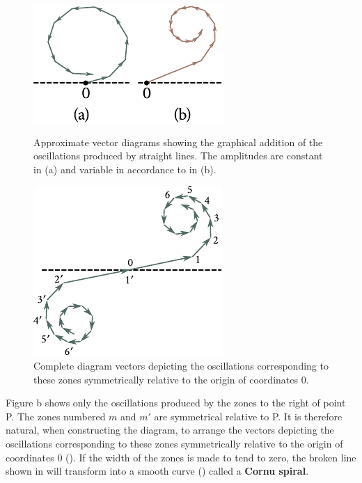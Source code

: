 \begin{figure}[t]
	\begin{minipage}[t]{0.48\linewidth}
		\begin{center}
			\includegraphics[scale=1]{figures/ch_18/fig_18_17.pdf}
            \caption[]{Approximate vector diagrams showing the graphical addition of the oscillations produced by straight lines. The amplitudes are constant in (a) and variable in accordance to  in (b).}
			\label{fig:18_17}
		\end{center}
	\end{minipage}
	\hfill{ }%
	\begin{minipage}[t]{0.48\linewidth}
		\begin{center}
			\includegraphics[scale=1]{figures/ch_18/fig_18_18.pdf}
			\caption[]{Complete diagram vectors depicting the oscillations corresponding to these zones symmetrically relative to the origin of coordinates $0$.}
			\label{fig:18_18}
		\end{center}
	\end{minipage}
\vspace{-0.4cm}
\end{figure}

Figure b shows only the oscillations produced by the zones to the right of point P.
The zones numbered $m$ and $m'$ are symmetrical relative to P.
It is therefore natural, when constructing the diagram, to arrange the vectors depicting the oscillations corresponding to these zones symmetrically relative to the origin of coordinates $0$ ().
If the width of the zones is made to tend to zero, the broken line shown in  will transform into a smooth curve () called a \textbf{Cornu spiral}.

